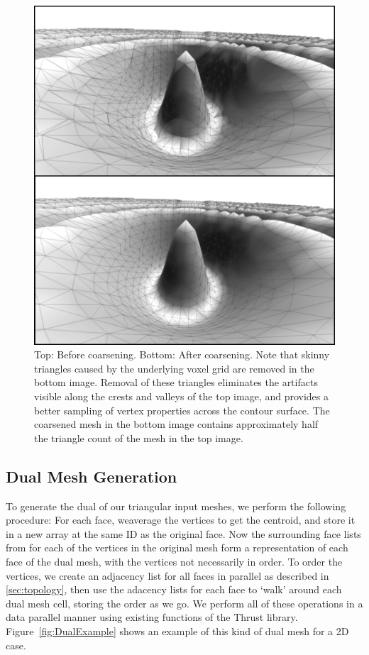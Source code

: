 \documentclass[review,journal]{vgtc}         %
\begin{document}
\begin{figure}[!tb]
\includegraphics[width=\columnwidth]{Coarsening}
\caption{Top: Before coarsening. Bottom: After coarsening. Note that skinny triangles caused by the underlying voxel grid are removed in the bottom image. Removal of these triangles eliminates the artifacts visible along the crests and valleys of the top image, and provides a better sampling of vertex properties across the contour surface. The coarsened mesh in the bottom image contains approximately half the triangle count of the mesh in the top image.}

\label{fig:coarsening}
\end{figure}


\subsection{Dual Mesh Generation}
To generate the dual of our triangular input meshes, we perform the following procedure: For each face, weaverage the vertices to get the centroid, and store it in a new array at the same ID as the original face. Now the surrounding face lists from  for each of the vertices in the original mesh form a representation of each face of the dual mesh, with the vertices not necessarily in order. To order the vertices, we create an adjacency list for all faces in parallel as described in \ref{sec:topology}, then use the adacency lists for each face to `walk' around each dual mesh cell, storing the order as we go. We perform all of these operations in a data parallel manner using existing functions of the Thrust library. Figure~\ref{fig:DualExample} shows an example of this kind of dual mesh for a 2D case.
\end{document}
